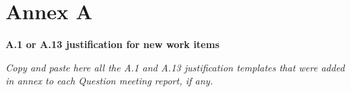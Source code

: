 
\appendix
\section*{Annex A}\label{annex-a}

\begin{center}
\textbf{A.1 or A.13 justification for new work items}
\end{center}

\textit{Copy and paste here all the A.1 and A.13 justification templates that were added in annex to each Question meeting report, if any.}
